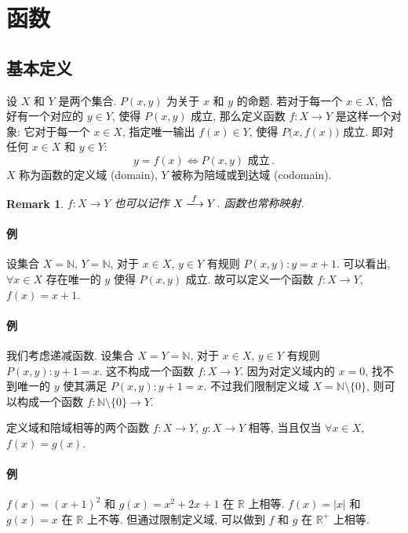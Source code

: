 \documentclass[UTF8]{ctexart}
\theoremstyle{mystyle}
\theoremstyle{myremark}
\newtheorem*{remark}{Remark}
\theoremstyle{plain}
\newcommand{\R}{\mathbb R}
\newcommand{\N}{\mathbb N}
\newcommand{\set}[1]{\{#1\}}
\begin{document}
\section{函数}
\subsection{基本定义}
\begin{definition}[\text{函数}]
    设 $ X $ 和 $ Y $ 是两个集合. $ P(x, y) $ 为关于 $ x $ 和 $ y $ 的命题. 若对于每一个 $ x \in X $, 恰好有一个对应的 $ y \in Y $, 使得 $ P(x, y) $ 成立, 那么定义函数 $ f \colon X \to Y $ 是这样一个对象: 它对于每一个 $ x \in X $, 指定唯一输出 $ f(x) \in Y $, 使得 $ P \big( x, f(x) \big) $ 成立. 即对任何 $ x \in X $ 和 $ y \in Y $: \[ y = f(x) \Longleftrightarrow P(x, y) \text{ 成立} \,.\] $ X $ 称为函数的定义域 (domain), $ Y $ 被称为陪域或到达域 (codomain).
\end{definition}

\begin{remark}
    $ f \colon X \to Y $ 也可以记作 $ X \xlongrightarrow{f} Y $. 函数也常称映射.
\end{remark}

\paragraph{例}
设集合 $ X = \N $, $ Y = \N $, 对于 $ x \in X $, $ y \in Y $ 有规则 $ P(x, y): y = x + 1 $. 可以看出, $ \forall x \in X $ 存在唯一的 $ y $ 使得 $ P(x, y) $ 成立. 故可以定义一个函数 $ f \colon X \to Y $, $ f(x) = x + 1 $.

\paragraph{例}
我们考虑递减函数. 设集合 $ X = Y = \N $, 对于 $ x \in X $, $ y \in Y $ 有规则 $ P(x, y): y + 1 = x $. 这不构成一个函数 $ f \colon X \to Y $. 因为对定义域内的 $ x = 0 $, 找不到唯一的 $ y $ 使其满足 $ P(x, y): y + 1 = x $. 不过我们限制定义域 $ X = \N \setminus \set{0} $, 则可以构成一个函数 $ f \colon \N \setminus \set{0} \to Y $.

\begin{definition}
    定义域和陪域相等的两个函数 $ f \colon X \to Y $, $ g: X \to Y $ 相等, 当且仅当 $ \forall x \in X $, $ f(x) = g(x) $.
\end{definition}

\paragraph{例}
$ f(x) = (x + 1)^2 $ 和 $ g(x) = x^2 + 2 x + 1 $ 在 $ \R $ 上相等. $ f(x) = |x| $ 和 $ g(x) = x $ 在 $ \R $ 上不等. 但通过限制定义域, 可以做到 $ f $ 和 $ g $ 在 $ \R^+ $ 上相等.
\end{document}
